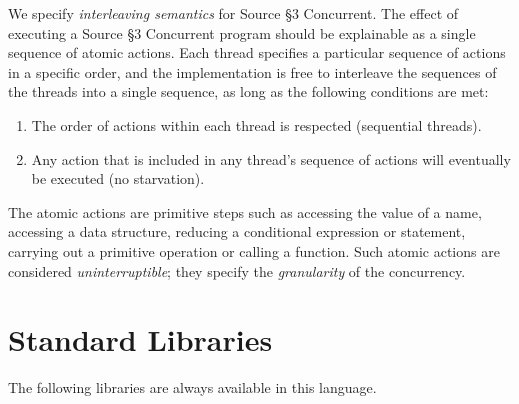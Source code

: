 We specify \emph{interleaving semantics} for Source \S 3 Concurrent.
The effect of executing a Source \S 3 Concurrent program
should be explainable as a single sequence of atomic actions. Each thread
specifies a particular sequence of actions in a specific order,
and the implementation is free to interleave the sequences of the threads
into a single sequence, as long as the following conditions are met:
\begin{enumerate}
\item The order of actions within each thread is respected (sequential
  threads).
\item Any action that is included in any thread's sequence of actions will
  eventually be executed (no starvation).
\end{enumerate}
\noindent
The atomic actions are primitive steps such as accessing the value of a name,
accessing a data structure, reducing a conditional expression or statement,
carrying out a primitive operation or calling a function. Such atomic actions
are considered \emph{uninterruptible}; they specify the \emph{granularity}
of the concurrency.



\newpage



\newpage



















\section{Standard Libraries}

The following libraries are always available in this language.

















\newpage



\newpage



    
